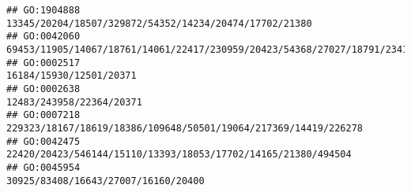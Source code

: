 \documentclass[
]{article}
\begin{document}
\begin{verbatim}
## GO:1904888                                                                                                                                                                                                                                                                                                                                                       13345/20204/18507/329872/54352/14234/20474/17702/21380
## GO:0042060                                                                                                                                                                                                                                                             69453/11905/14067/18761/14061/22417/230959/20423/54368/27027/18791/234199/14234/20443/17312/20533/17702/14165/71753/106014/15160/100503895/11551
## GO:0002517                                                                                                                                                                                                                                                                                                                                                                                      16184/15930/12501/20371
## GO:0002638                                                                                                                                                                                                                                                                                                                                                                                     12483/243958/22364/20371
## GO:0007218                                                                                                                                                                                                                                                                                                                                              229323/18167/18619/18386/109648/50501/19064/217369/14419/226278
## GO:0042475                                                                                                                                                                                                                                                                                                                                                22420/20423/546144/15110/13393/18053/17702/14165/21380/494504
## GO:0045954                                                                                                                                                                                                                                                                                                                                                                          30925/83408/16643/27007/16160/20400

\end{verbatim}
\end{document}
